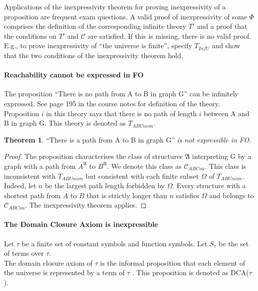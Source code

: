 \documentclass[10pt,a4paper]{article}
\theoremstyle{definition}
\newtheorem{theorem}{Theorem}
\begin{document}
Applications of the inexpressivity theorem for proving inexpressivity of a proposition are frequent exam questions. A valid proof of inexpressivity of some $\Phi$ comprises the definition of the corresponding infinite theory $T'$ and a proof that the conditions on $T'$ and $\mathcal{C}$ are satisfied. If this is missing, there is no valid proof. E.g., to prove inexpressivity of “the universe is finite”, specify $T_{InfU}$ and show that the two conditions of the inexpressivity theorem hold.

\paragraph{Reachability cannot be expressed in FO} 

The proposition “There is no path from A to B in graph G” can be infinitely expressed. See page 195 in the course notes for definition of the theory. Proposition $i$ in this theory says that there is no path of length $i$ between A and B in graph G. This theory is denoted as $T_{ABUncon}$.

\begin{theorem}
“There is a path from A to B in graph G” \textit{is not expressible in FO}.
\end{theorem}

\begin{proof}
The proposition characterises the class of structures $\mathfrak{A}$ interpreting G by a graph with a path from $A^\mathfrak{A}$ to $B^\mathfrak{A}$. We denote this class as $\mathcal{C}_{ABCon}$. This class is inconsistent with $T_{ABUncon}$
but consistent with each finite subset $\Omega$ of $T_{ABUncon}$. Indeed, let $n$ be the largest path length
forbidden by $\Omega$. Every structure with a shortest path from $A$ to $B$ that is strictly longer than $n$
satisfies $\Omega$ and belongs to $\mathcal{C}_{ABCon}$. The inexpressivity theorem applies.
\end{proof}

\paragraph{The Domain Closure Axiom is inexpressible}

Let $\tau$ be a finite set of constant symbols and function symbols. Let $S_\tau$ be the set of terms over $\tau$. \\

The domain closure axiom of $\tau$ is the informal proposition that each element of the universe is represented by a term of $\tau$ . This proposition is denoted as DCA($\tau$). \\
\end{document}
